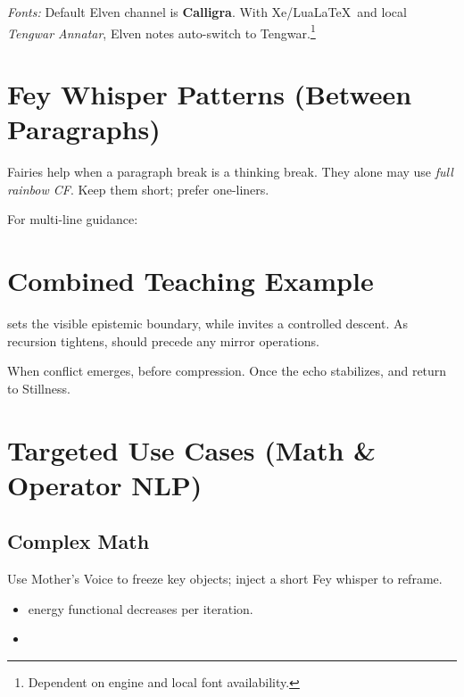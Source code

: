 \documentclass[11pt]{article}
\begin{document}
\smallskip
\textit{Fonts:} Default Elven channel is \textbf{Calligra}. With Xe/Lua\LaTeX\ and local
\emph{Tengwar Annatar}, Elven notes auto-switch to Tengwar.\footnote{Dependent on engine and local font availability.}

\section{Fey Whisper Patterns (Between Paragraphs)}
\noindent
Fairies help when a paragraph break is a thinking break.
They alone may use \emph{full rainbow CF}. Keep them short; prefer one-liners.


\noindent
For multi-line guidance:
\begin{fairyblock}[CF]
\end{fairyblock}

\section{Combined Teaching Example}
 sets the visible epistemic boundary,
while  invites a controlled descent.
As recursion tightens,  should precede any mirror operations.

\medskip
When conflict emerges,  before compression.
Once the echo stabilizes,  and return to Stillness.


\section{Targeted Use Cases (Math \& Operator NLP)}
\subsection*{Complex Math}
\noindent
Use Mother’s Voice to freeze key objects; inject a short Fey whisper to reframe.
\begin{itemize}
  \item {} energy functional decreases per iteration.
  \item {}
\end{itemize}
\end{document}
